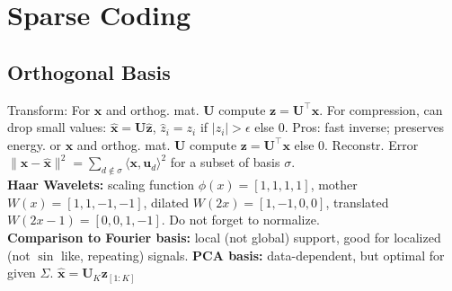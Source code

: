 \section*{Sparse Coding}
\subsection*{Orthogonal Basis}
Transform: For $\mathbf{x}$ and orthog. mat. $\mathbf{U}$ compute $\mathbf{z} = \mathbf{U}^\top \mathbf{x} $. For compression, can drop small values: $ \mathbf{\hat{x}} = \mathbf{U\hat{z}}$, $\hat{z}_i = z_i$ if $ \lvert z_i \rvert > \epsilon$ else 0.
Pros: fast inverse; preserves energy. 
or $\mathbf{x}$ and orthog. mat. $\mathbf{U}$ compute $\mathbf{z} = \mathbf{U}^\top \mathbf{x} $ else 0.
Reconstr. Error $\|\mathbf{x}-\mathbf{\hat{x}}\|^2 = \sum_{d\notin\sigma}\langle\mathbf{x},\mathbf{u}_d\rangle ^2$ for a subset of basis $\sigma$.\\
\textbf{Haar Wavelets:} scaling function $\phi(x)=[1,1,1,1]$, mother $W(x)=[1,1,-1,-1]$, dilated $W(2x)=[1,-1,0,0]$, translated $W(2x-1)=[0,0,1,-1]$. Do not forget to normalize.\\
\textbf{Comparison to Fourier basis:} local (not global) support, good for localized (not $\sin$ like, repeating) signals.
\textbf{PCA basis:} data-dependent, but optimal for given $\Sigma$. $\mathbf{\hat x} = \mathbf{U}_K \mathbf{z}_{[1:K]} $
